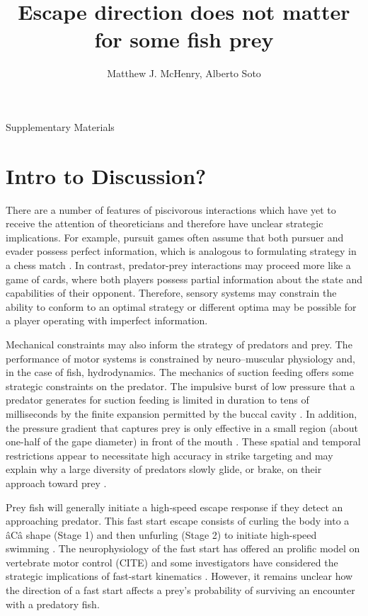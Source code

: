 \documentclass[12pt]{article}
\title{Escape direction does not matter for some fish prey}
\author{Matthew J. McHenry, Alberto Soto}
\begin{document}

\maketitle
{\Large Supplementary Materials}

\tableofcontents
\section{Intro to Discussion?}


There are a number of features of piscivorous interactions which have yet to receive the attention of theoreticians and therefore have unclear strategic implications. For example, pursuit games often assume that both pursuer and evader possess perfect information, which is analogous to formulating strategy in a chess match \citep{Salen:2004wp}. In contrast, predator-prey interactions may proceed more like a game of cards, where both players possess partial information about the state and capabilities of their opponent. Therefore, sensory systems may constrain the ability to conform to an optimal strategy or different optima may be possible for a player operating with imperfect information. 

Mechanical constraints may also inform the strategy of predators and prey. The performance of motor systems is constrained by neuro--muscular physiology and, in the case of fish, hydrodynamics. The mechanics of suction feeding offers some strategic constraints on the predator. The impulsive burst of low pressure that a predator generates for suction feeding is limited in duration to tens of milliseconds  by the finite expansion permitted by the buccal cavity \citep{Wainwright:2001ufa}. In addition, the pressure gradient that captures prey is only effective in a small region (about one-half of the gape diameter) in front of the mouth \citep{Day:2005p5856}. These spatial and temporal restrictions appear to necessitate high accuracy in strike targeting and may explain why a large diversity of predators slowly glide, or brake, on their approach toward prey \citep{Higham:2005iu, Higham:2007go}. 


Prey fish will generally initiate a high-speed escape response if they detect an approaching predator. This fast start escape consists of curling the body into a âCâ shape (Stage 1) and then unfurling (Stage 2) to initiate high-speed swimming \citep{D:1973up}. The neurophysiology of the fast start has offered an prolific model on vertebrate motor control (CITE) and some investigators have considered the strategic implications of fast-start kinematics \citep[reviewed by][]{Domenici:2011tv, Domenici:2011vl}. However, it remains unclear how the direction of a fast start affects a prey's probability of surviving an encounter with a predatory fish. 
\end{document}
